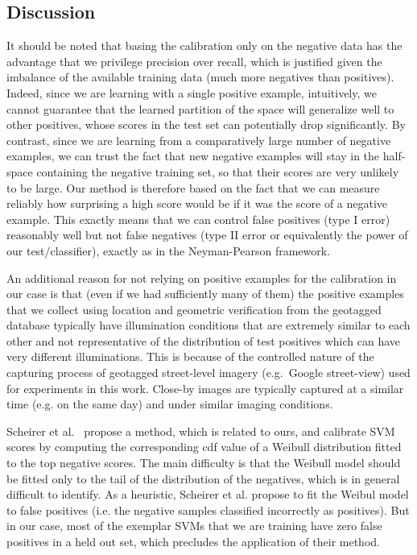    \subsection{Discussion}
   \label{sec:discussion}
      It should be noted that basing the calibration only on the negative data has the advantage that we privilege precision over recall, which is justified given the imbalance of the available training data (much more negatives than positives).
      Indeed, since we are learning with a single positive example, intuitively, we cannot guarantee that the learned partition of the space will generalize well to other positives, whose scores in the test set can potentially drop significantly. %
      By contrast, since we are learning from a comparatively large number of negative examples, we can trust the fact that new negative examples will stay in the half-space containing the negative training set, so that their scores are very unlikely to be large. Our method is therefore based on the fact that we can measure reliably how surprising a high score would be if it was the score of a negative example. This exactly means that we can control false positives (type I error) reasonably well but not false negatives (type II error or equivalently the power of our test/classifier), exactly as in the Neyman-Pearson framework.

      An additional reason for not relying on positive examples for the calibration in our case is that (even if we had sufficiently many of them) the positive examples that we collect using location and geometric verification from the geotagged database typically have illumination conditions that are extremely similar to each other and not representative of the distribution of test positives which can have very different illuminations. This is because of the controlled nature of the capturing process of geotagged street-level imagery (e.g.\ Google street-view) used for experiments in this work. Close-by images are typically captured at a similar time (e.g. on the same day) and under similar imaging conditions.

      Scheirer et al.~\cite{Scheirer12} propose a method, which is related to ours, and calibrate SVM scores by computing the corresponding cdf value of a Weibull distribution fitted to the top negative scores. The main difficulty is that the Weibull model should be fitted only to the tail of the distribution of the negatives, which is in general difficult to identify. As a heuristic, Scheirer et al. propose to fit the Weibul model to false positives (i.e. the negative samples classified incorrectly as positives). But in our case, most of the exemplar SVMs that we are training have zero false positives in a held out set, which precludes the application of their method. 


